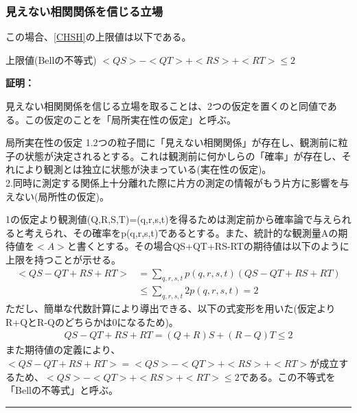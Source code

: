 \documentclass[a4paper,10.5pt]{article}
\numberwithin{equation}{section}
\newenvironment{proofbox}
{\begin{prooflabel}\textbf{証明：}\end{prooflabel}\vspace{0.8em}}
{\par\vspace{1em}\hrule\vspace{1em}}
\begin{document}
\subsubsection{見えない相関関係を信じる立場}
この場合、\eqref{CHSH}の上限値は以下である。
\begin{resultbox}{上限値(Bellの不等式)}
$<QS>-<QT>+<RS>+<RT>\leq2$
\end{resultbox}
\begin{proofbox}
見えない相関関係を信じる立場を取ることは、2つの仮定を置くのと同値である。この仮定のことを「局所実在性の仮定」と呼ぶ。
\begin{itembox}[l]{局所実在性の仮定}
1.2つの粒子間に「見えない相関関係」が存在し、観測前に粒子の状態が決定されるとする。これは観測前に何かしらの「確率」が存在し、それにより観測とは独立に状態が決まっている(実在性の仮定)。\\
2.同時に測定する関係上十分離れた際に片方の測定の情報がもう片方に影響を与えない(局所性の仮定)。
\end{itembox}
1の仮定より観測値(Q,R,S,T)=(q,r,s,t)を得るためは測定前から確率論で与えられると考えられ、その確率をp(q,r,s,t)であるとする。また、統計的な観測量Aの期待値を$<A>$と書くとする。その場合QS+QT+RS-RTの期待値は以下のように上限を持つことが示せる。
\begin{equation}\begin{split}
    <QS-QT+RS+RT> &= \sum_{q,r,s,t} p(q,r,s,t)(QS-QT+RS+RT)\\
    &\leq \sum_{q,r,s,t} 2p(q,r,s,t) = 2
\end{split} \end{equation}
ただし、簡単な代数計算により導出できる、以下の式変形を用いた(仮定よりR+QとR-Qのどちらかは0になるため)。
\begin{equation}\begin{split}
    QS-QT+RS+RT=(Q+R)S + (R-Q)T \leq 2 \label{CHSH}
\end{split} \end{equation}
また期待値の定義により、$<QS-QT+RS+RT>=<QS>-<QT>+<RS>+<RT>$が成立するため、$<QS>-<QT>+<RS>+<RT>\leq2$である。この不等式を「Bellの不等式」と呼ぶ。
\end{proofbox}
\end{document}
